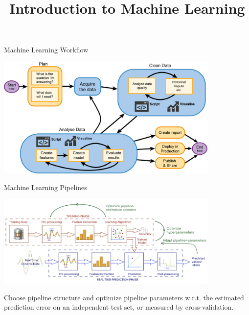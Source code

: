 



\newcommand{\titlefigure}{figure_man/automl2.png}
\newcommand{\learninggoals}{
  \item ...
  \item ...
}

\title{Introduction to Machine Learning}
\date{}






\begin{vbframe}{Machine Learning Workflow}
    \begin{center}
        \includegraphics[width = 11cm]{figure_man/ml-workflow-big.png}
    \end{center}
\end{vbframe}

\begin{vbframe}{Machine Learning Pipelines}
    \begin{center}
        \includegraphics[width = 11cm]{figure_man/automl2.png}
    \end{center}
    Choose pipeline structure and optimize pipeline parameters w.r.t. the estimated prediction error on an independent test set, or measured by cross-validation.
\end{vbframe}

